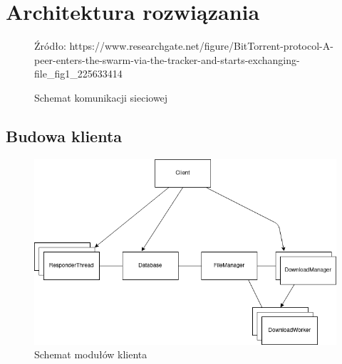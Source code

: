 \documentclass[11pt]{article}
\begin{document}
\section{Architektura rozwiązania}
\begin{figure}[h]
\caption{Schemat komunikacji sieciowej}
\centering
{}
{Źródło: https://www.researchgate.net/figure/BitTorrent-protocol-A-peer-enters-the-swarm-via-the-tracker-and-starts-exchanging-file\_fig1\_225633414}
\end{figure}
\clearpage
\subsection{Budowa klienta}
\begin{figure}[h]
\caption{Schemat modułów klienta}
\centering
\includegraphics[scale=0.7]{diagcli}
\end{figure}
\end{document}
